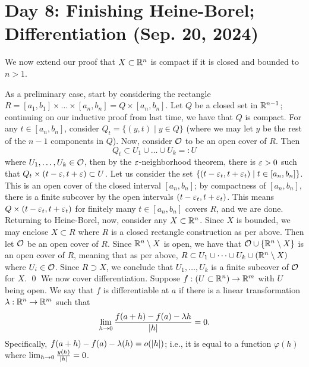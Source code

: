 \section{Day 8: Finishing Heine-Borel; Differentiation (Sep. 20, 2024)}
\begin{simplethm}
    We now extend our proof that $X \subset \mathbb R^n$ is compact if it is closed and bounded to $n > 1$.
\end{simplethm}
\noindent As a preliminary case, start by considering the rectangle $R = [a_1, b_1] \times \dots \times [a_n, b_n] = Q \times [a_n, b_n]$. Let $Q$ be a closed set in $\mathbb R^{n-1}$; continuing on our inductive proof from last time, we have that $Q$ is compact. For any $t \in [a_n, b_n]$, consider $Q_t = \{(y, t) \mid y \in Q\}$ (where we may let $y$ be the rest of the $n-1$ components in $Q$).
\medskip\newline
\noindent Now, consider $\mathcal O$ to be an open cover of $R$. Then
\[ Q_t \subset U_1 \cup \dots \cup U_k =: U \]
where $U_1, \dots, U_k \in \mathcal O$, then by the $\varepsilon$-neighborhood theorem, there is $\varepsilon > 0$ such that $Q_t \times (t - \varepsilon, t + \varepsilon) \subset U$. Let us consider the set $\{(t - \varepsilon_t, t + \varepsilon_t) \mid t \in [a_n, b_n]\}$. This is an open cover of the closed interval $[a_n, b_n]$; by compactness of $[a_n, b_n]$, there is a finite subcover by the open intervals $(t - \varepsilon_t, t + \varepsilon_t)$. This means $Q \times (t - \varepsilon_t, t + \varepsilon_t)$ for finitely many $t \in [a_n, b_n]$ covers $R$, and we are done.
\medskip\newline
\noindent Returning to Heine-Borel, now, consider any $X \subset \mathbb R^n$. Since $X$ is bounded, we may enclose $X \subset R$ where $R$ is a closed rectangle construction as per above. Then let $\mathcal O$ be an open cover of $R$. Since $\mathbb R^n \setminus X$ is open, we have that $\mathcal O \cup \{\mathbb R^n \setminus X\}$ is an open cover of $R$, meaning that as per above, $R \subset U_1 \cup \dots \cup U_k \cup (\mathbb R^n \setminus X)$ where $U_i \in \mathcal O$. Since $R \supset X$, we conclude that $U_1, \dots, U_k$ is a finite subcover of $\mathcal O$ for $X$. \qed
\medskip\newline
\noindent We now cover differentiation. Suppose $f : (U \subset \mathbb R^n) \to \mathbb R^m$ with $U$ being open. We say that $f$ is differentiable at $a$ if there is a linear transformation $\lambda : \mathbb R^n \to \mathbb R^m$ such that
\[ \lim_{h \to 0} \frac{f(a + h) - f(a) - \lambda h}{\left\lvert h \right\rvert} = 0. \]
Specifically, $f(a + h) - f(a) - \lambda(h) = o(\left\lvert h \right\rvert)$; i.e., it is equal to a function $\varphi(h)$ where $\lim_{h \to 0} \frac{y(h)}{\left\lvert h \right\rvert} = 0$.
